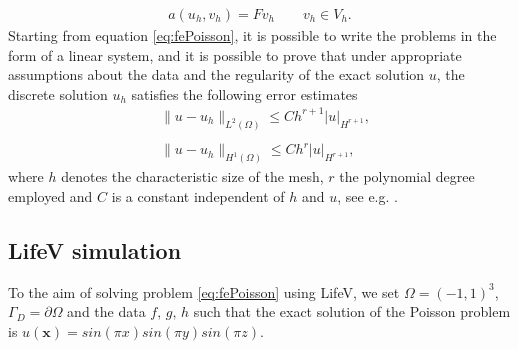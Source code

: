\begin{align}\label{eq:fePoisson}
a(u_h, v_h) = Fv_h \qquad v_h \in V_h.
\end{align}
Starting from equation \eqref{eq:fePoisson}, it is possible to write the problems in the form of a linear system, and it is possible to prove that under appropriate assumptions about the data and the regularity of the exact solution $ u $, the discrete solution $ u_h $ satisfies the following error estimates
\begin{align}\label{eq:stimaHL}
& \|u-u_h\|_{L^2(\Omega)}  \leq Ch^{r+1}|u|_{H^{r+1}}, \\ &\nonumber \\ \label{eq:stimaH1}
& \|u-u_h\|_{H^1(\Omega)}  \leq Ch^r|u|_{H^{r+1}},
\end{align}
where $ h $ denotes the characteristic size of the mesh, $r$ the polynomial degree employed and $ C $ is a constant independent of $ h $ and $ u $, see e.g. \cite{CMCSBOOK2009002}.

\subsection{LifeV simulation}
To the aim of solving problem \eqref{eq:fePoisson} using LifeV, we set $ \Omega = (-1, 1)^3 $, $ \Gamma_D = \partial \Omega $ and the data $f, \, g, \, h $ such that the exact solution of the Poisson problem is  $ u(\mathbf{x}) = sin(\pi x)sin(\pi y)sin(\pi z) $.
